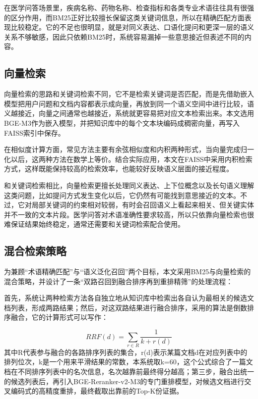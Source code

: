 在医学问答场景里，疾病名称、药物名称、检查指标和各类专业术语往往具有很强的区分作用，而BM25正好比较擅长保留这类关键词信息，所以在精确匹配方面表现比较稳定。它的不足也很明显，就是对同义表达、口语化提问和更深一层的语义关系不够敏感，因此只依赖BM25时，系统容易漏掉一些意思接近但表述不同的内容。

\subsection{向量检索}

向量检索的思路和关键词检索不同，它不是检索关键词是否匹配，而是先借助嵌入模型把用户问题和文档内容都表示成向量，再放到同一个语义空间中进行比较，语义越接近，向量之间通常也越接近，系统就更容易把对应文本检索出来。本文选用BGE-M3作为嵌入模型\cite{chen2025m3embeddingmultilingualitymultifunctionalitymultigranularity}，并把知识库中的每个文本块编码成稠密向量，再写入FAISS索引中保存。

在相似度计算方面，常见方法主要有余弦相似度和内积两种形式，当向量完成归一化以后，这两种方法在数学上等价。结合实际应用，本文在FAISS中采用内积检索方式，这样既能保持较高的检索效率，也能较好反映语义层面的接近程度。

和关键词检索相比，向量检索更擅长处理同义表达、上下位概念以及长句语义理解这类问题，比如提问方式发生变化以后，它仍然有可能找到意思接近的文本。不过，它对局部关键词的约束相对较弱，有时会召回语义上看起来相关、但关键实体并不一致的文本片段。医学问答对术语准确性要求较高，所以只依靠向量检索也很难保证结果始终稳定，通常还需要和关键词检索配合使用。

\subsection{混合检索策略}

为兼顾“术语精确匹配”与“语义泛化召回”两个目标，本文采用BM25与向量检索的混合策略，并设计了一条“双路召回到融合排序再到重排精筛”的处理流程：

首先，系统让两种检索方法各自独立地从知识库中检索出各自认为最相关的候选文档列表，形成两路结果；然后，对这双路结果进行融合排序，采用的算法是倒数排序融合\cite{10.1145/1571941.1572114}，它的计算形式可以写作：

\begin{equation}
RRF(d)=\sum_{r\in R}\frac{1}{k+r(d)}
\end{equation}
其中R代表参与融合的各路排序列表的集合，r(d)表示某篇文档d在对应列表中的排列位次，k是一个用来平滑结果的常数，本系统取k=60，这个公式综合了一篇文档在不同排序列表中的名次信息，名次越靠前最终得分越高；第三步，融合出统一的候选列表后，再引入BGE-Reranker-v2-M3的专门重排模型，对候选文档进行交叉编码式的高精度重排，最终截取出靠前的Top-K份证据。

